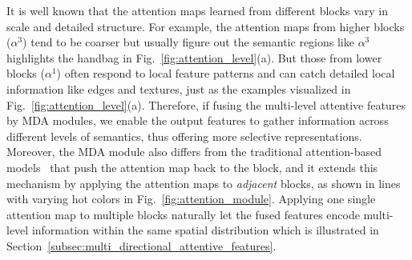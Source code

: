 \documentclass[10pt,twocolumn,letterpaper]{article}
\begin{document}
%
It is well known that the attention maps learned from different blocks vary in scale and detailed structure.
%
For example, the attention maps from higher blocks (\eg $\alpha^3$) tend to be coarser but usually figure out the semantic regions like $\alpha^3$ highlights the handbag in Fig.~\ref{fig:attention_level}(a).
%
But those from lower blocks (\eg $\alpha^1$) often respond to local feature patterns and can catch detailed local information like edges and textures, just as the examples visualized in Fig.~\ref{fig:attention_level}(a).
%
Therefore, if fusing the multi-level attentive features by MDA modules, we enable the output features to gather information across different levels of semantics, thus offering more selective representations.
%
Moreover, the MDA module also differs from the traditional attention-based models~\cite{newell2016stacked,xu2015show} that push the attention map back to the  block, and it extends this mechanism by applying the attention maps to \textit{adjacent} blocks, as shown in lines with varying hot colors in Fig.~\ref{fig:attention_module}.
%
Applying one single attention map to multiple blocks naturally let the fused features encode multi-level information within the same spatial distribution which is illustrated in Section~\ref{subsec:multi_directional_attentive_features}.
\end{document}

